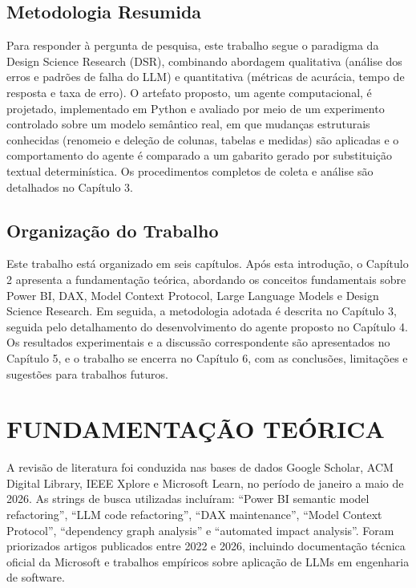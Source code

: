 \documentclass[
    12pt,               %
    openright,          %
    oneside,            %
    a4paper,            %
    chapter=TITLE,      %
    section=TITLE,      %
    brazil              %
]{abntex2}
\begin{document}
\section{Metodologia Resumida}

Para responder à pergunta de pesquisa, este trabalho segue o paradigma da Design Science Research (DSR), combinando abordagem qualitativa (análise dos erros e padrões de falha do LLM) e quantitativa (métricas de acurácia, tempo de resposta e taxa de erro). O artefato proposto, um agente computacional, é projetado, implementado em Python e avaliado por meio de um experimento controlado sobre um modelo semântico real, em que mudanças estruturais conhecidas (renomeio e deleção de colunas, tabelas e medidas) são aplicadas e o comportamento do agente é comparado a um gabarito gerado por substituição textual determinística. Os procedimentos completos de coleta e análise são detalhados no Capítulo 3.

\section{Organização do Trabalho}

Este trabalho está organizado em seis capítulos. Após esta introdução, o Capítulo 2 apresenta a fundamentação teórica, abordando os conceitos fundamentais sobre Power BI, DAX, Model Context Protocol, Large Language Models e Design Science Research. Em seguida, a metodologia adotada é descrita no Capítulo 3, seguida pelo detalhamento do desenvolvimento do agente proposto no Capítulo 4. Os resultados experimentais e a discussão correspondente são apresentados no Capítulo 5, e o trabalho se encerra no Capítulo 6, com as conclusões, limitações e sugestões para trabalhos futuros.

\chapter{FUNDAMENTAÇÃO TEÓRICA}

A revisão de literatura foi conduzida nas bases de dados Google Scholar, ACM Digital Library, IEEE Xplore e Microsoft Learn, no período de janeiro a maio de 2026. As strings de busca utilizadas incluíram: ``Power BI semantic model refactoring'', ``LLM code refactoring'', ``DAX maintenance'', ``Model Context Protocol'', ``dependency graph analysis'' e ``automated impact analysis''. Foram priorizados artigos publicados entre 2022 e 2026, incluindo documentação técnica oficial da Microsoft e trabalhos empíricos sobre aplicação de LLMs em engenharia de software.
\end{document}
